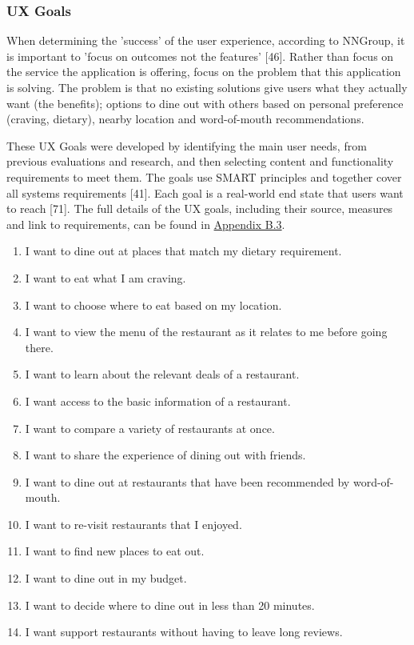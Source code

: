 \documentclass[a4 paper, 12pt]{article}
\begin{document}
    \subsubsection{UX Goals}
    When determining the 'success' of the user experience, according to NNGroup, it is important to 'focus on outcomes not the features' [46]. Rather than focus on the service the application is offering, focus on the problem that this application is solving. The problem is that no existing solutions give users what they actually want (the benefits); options to dine out with others based on personal preference (craving, dietary), nearby location and word-of-mouth recommendations.

    These UX Goals were developed by identifying the main user needs, from previous evaluations and research, and then selecting content and functionality requirements to meet them. The goals use SMART principles and together cover all systems requirements [41]. Each goal is a real-world end state that users want to reach [71]. The full details of the UX goals, including their source, measures and link to requirements, can be found in \hyperref[sec:B.3]{Appendix B.3}. 
        \begin{enumerate}
            \item I want to dine out at places that match my dietary requirement.
            \item I want to eat what I am craving.
            \item I want to choose where to eat based on my location. 
            \item I want to view the menu of the restaurant as it relates to me before going there.
            \item I want to learn about the relevant deals of a restaurant.
            \item I want access to the basic information of a restaurant.
            \item I want to compare a variety of restaurants at once.
            \item I want to share the experience of dining out with friends.
            \item I want to dine out at restaurants that have been recommended by word-of-mouth.
            \item I want to re-visit restaurants that I enjoyed.
            \item I want to find new places to eat out.
            \item I want to dine out in my budget.
            \item I want to decide where to dine out in less than 20 minutes.
            \item I want support restaurants without having to leave long reviews.
        \end{enumerate}
\end{document}
